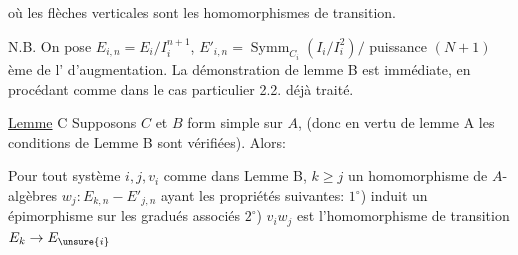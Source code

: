 où les flèches verticales sont les homomorphismes de transition.

N.B. On pose $E_{i,n}=E_i/I_i^{n+1}$, $E'_{i,n}=\operatorname{Symm}_{C_i}(I_i/I_i^2)/$ puissance $(N+1)$ème de l' d'augmentation. La démonstration de lemme B est immédiate, en procédant comme dans le cas particulier 2.2. déjà traité.

\uline{Lemme} C Supposons $C$ et $B$ form simple sur $A$, (donc en vertu de lemme A les conditions de Lemme B sont vérifiées). Alors:

 Pour tout  système $i,j,v_i$ comme dans Lemme B,  $k\geq j$  un homomorphisme de $A$-algèbres $w_j:E_{k,n}\mathbin{-}E'_{j,n}$ ayant les propriétés suivantes: $1^\circ$)  induit un épimorphisme sur les gradués associés $2^\circ$) $v_iw_j$ est l'homomorphisme de transition $E_k\to E_{\unsure{i}}$

